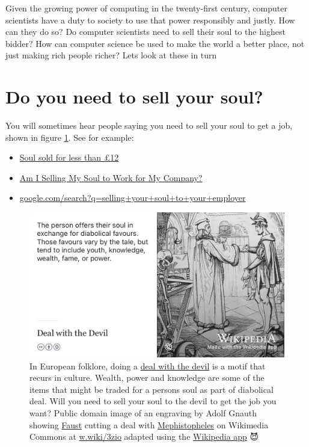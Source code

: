 \documentclass[
]{book}
\providecommand{\tightlist}{%
  \setlength{\itemsep}{0pt}\setlength{\parskip}{0pt}}
\begin{document}
Given the growing power of computing in the twenty-first century, computer scientists have a duty to society to use that power responsibly and justly. How can they do so? Do computer scientists need to sell their soul to the highest bidder? How can computer science be used to make the world a better place, not just making rich people richer? Lets look at these in turn

\hypertarget{soul}{%
\section{Do you need to sell your soul?}\label{soul}}

You will sometimes hear people saying you need to sell your soul to get a job, shown in figure \ref{fig:diabolical-fig}. See for example:

\begin{itemize}
\tightlist
\item
  \href{http://news.bbc.co.uk/1/hi/england/2051061.stm}{Soul sold for less than £12} \citep{bbcsoul}
\item
  \href{https://www.thevectorimpact.com/selling-your-soul/}{Am I Selling My Soul to Work for My Company?} \citep{sellmysoul}
\item
  \href{https://www.google.com/search?q=selling+your+soul+to+your+employer}{google.com/search?q=selling+your+soul+to+your+employer}
\end{itemize}

\begin{figure}

{\centering \includegraphics[width=1\linewidth]{images/deal-with-the-devil} 

}

\caption{In European folklore, doing a \href{https://en.wikipedia.org/wiki/Deal_with_the_Devil}{deal with the devil} is a motif that recurs in culture. Wealth, power and knowledge are some of the items that might be traded for a persons soul as part of diabolical deal. Will you need to sell your soul to the devil to get the job you want? Public domain image of an engraving by Adolf Gnauth showing \href{https://en.wikipedia.org/wiki/Faust}{Faust} cutting a deal with \href{https://en.wikipedia.org/wiki/Mephistopheles}{Mephistopheles} on Wikimedia Commons at \href{https://w.wiki/3zio}{w.wiki/3zio} adapted using the \href{https://apps.apple.com/gb/app/wikipedia/id324715238}{Wikipedia app} 😈}\label{fig:diabolical-fig}
\end{figure}
\end{document}
